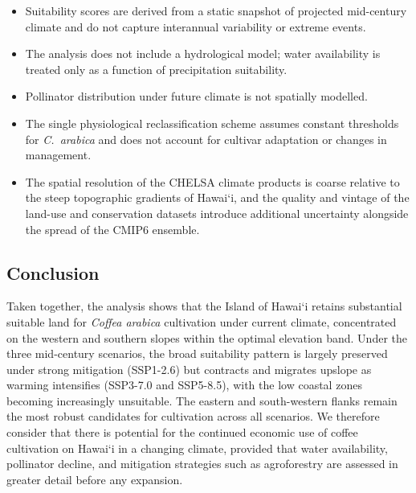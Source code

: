 \documentclass[12pt,a4paper]{article}
\newcommand{\okina}{\textquoteleft}
\begin{document}
\begin{itemize}
  \item Suitability scores are derived from a static snapshot of projected mid-century climate and do not capture interannual variability or extreme events.
  \item The analysis does not include a hydrological model; water availability is treated only as a function of precipitation suitability.
  \item Pollinator distribution under future climate is not spatially modelled.
  \item The single physiological reclassification scheme assumes constant thresholds for \textit{C.~arabica} and does not account for cultivar adaptation or changes in management.
  \item The spatial resolution of the CHELSA climate products is coarse relative to the steep topographic gradients of Hawai\okina i, and the quality and vintage of the land-use and conservation datasets introduce additional uncertainty alongside the spread of the CMIP6 ensemble.
\end{itemize}

\subsection{Conclusion}

Taken together, the analysis shows that the Island of Hawai\okina i retains substantial suitable land for \textit{Coffea arabica} cultivation under current climate, concentrated on the western and southern slopes within the optimal elevation band. Under the three mid-century scenarios, the broad suitability pattern is largely preserved under strong mitigation (SSP1-2.6) but contracts and migrates upslope as warming intensifies (SSP3-7.0 and SSP5-8.5), with the low coastal zones becoming increasingly unsuitable. The eastern and south-western flanks remain the most robust candidates for cultivation across all scenarios. We therefore consider that there is potential for the continued economic use of coffee cultivation on Hawai\okina i in a changing climate, provided that water availability, pollinator decline, and mitigation strategies such as agroforestry are assessed in greater detail before any expansion.


\newpage

\end{document}
